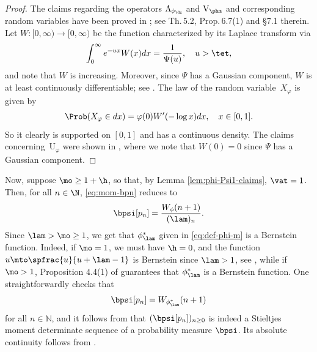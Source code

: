 \begin{proof}
The claims regarding the operators $\Lambda_{\phi_{\dz}}$ and $\mathrm{V}_{\phm}$ and corresponding random variables have been proved in \cite{Patie-Savov-GeL}; see Th.\,5.2, Prop.\,6.7(1) and \S 7.1 therein. Let $W \colon [0,\infty) \to [0,\infty)$ be the function characterized by its Laplace transform via
\begin{equation*}
\int_{0}^{\infty}e^{-u x}W(x)dx = \frac{1}{\Psi(u)}, \quad u > \tet,
\end{equation*}
and note that $W$ is increasing. Moreover, since $\Psi$ has a Gaussian component, $W$ is at least continuously differentiable; see \eg \cite[\S 8.2]{Kyprianou2014}. The law of the random variable~$X_\varphi$ is given by
\begin{equation*}
\Prob(X_\varphi \in dx) = \varphi(0)W'(-\log x)dx, \quad x \in [0,1].
\end{equation*}
So it clearly is supported on $[0,1]$ and has a continuous density. The claims concerning~$\mathrm{U}_{\varphi}$ were shown in \cite[Lem.\,4.2]{Intertwining-Krein}, where we note that $W(0)=0$ since $\Psi$ has a Gaussian component.
\end{proof}

Now, suppose $\mo \geq 1+\h$, so that, by Lemma \ref{lem:phi-Psi1-claims}, $\vat= 1$. Then, for all $n\in\N$, \eqref{eq:mom-bpn} reduces to
\begin{equation*}
\bpsi[p_n] = \frac{W_{\phi}(n+1)}{(\lam)_n}.
\end{equation*}
Since $\lam > \mo \geq 1$, we get that $\phi_{\lam}^*$ given in \eqref{eq:def-phi-m} is a Bernstein function. Indeed, if $\mo = 1$, we must have $\h = 0$, and the function $u \mto \spfrac{u}{u+\lam-1}$ is Bernstein since $\lam > 1$, see \eg \cite[Chap.\,16]{SchillingSongVondracek10}, while if $\mo > 1$, Proposition 4.4(1) of \cite{SchillingSongVondracek10}
guarantees that $\phi_{\lam}^*$ is a Bernstein function. One straightforwardly checks that
\begin{equation*}
\bpsi[p_n] = W_{\phi_{\lam}^*}(n+1)
\end{equation*}
for all $n\in \mathbb{N}$, and it follows from \cite{Berg} that $(\bpsi [p_n])_{n\geq 0}$ is indeed a Stieltjes moment determinate sequence of a probability measure $\bpsi$. Its absolute continuity follows from \cite[Prop.\,2.4]{Patie-11-Factorization_e}.

